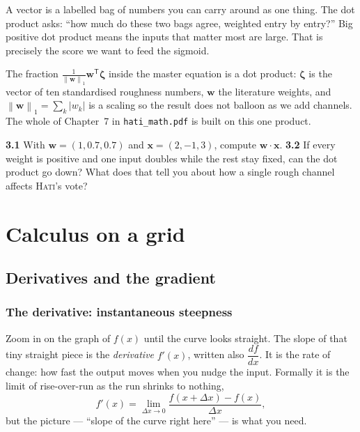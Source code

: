 \documentclass[11pt,oneside]{book}
\newcommand{\norm}[1]{\left\lVert #1\right\rVert}
\newcommand{\abs}[1]{\left\lvert #1\right\rvert}
\begin{document}
\begin{intuition}
A vector is a labelled bag of numbers you can carry around as one thing. The dot
product asks: ``how much do these two bags agree, weighted entry by entry?'' Big
positive dot product means the inputs that matter most are large. That is precisely
the score we want to feed the sigmoid.
\end{intuition}

\begin{hatibox}
The fraction $\frac{1}{\norm{\mathbf w}_1}\mathbf w^{\mathsf T}\boldsymbol\zeta$ inside
the master equation is a dot product: $\boldsymbol\zeta$ is the vector of ten
standardised roughness numbers, $\mathbf w$ the literature weights, and
$\norm{\mathbf w}_1=\sum_k\abs{w_k}$ is a scaling so the result does not balloon as we
add channels. The whole of Chapter~7 in \texttt{hati\_math.pdf} is built on this one
product.
\end{hatibox}

\begin{practice}
\textbf{3.1} With $\mathbf w=(1,0.7,0.7)$ and $\mathbf x=(2,-1,3)$, compute
$\mathbf w\cdot\mathbf x$. \quad\textbf{3.2} If every weight is positive and one input
doubles while the rest stay fixed, can the dot product go down? What does that tell you
about how a single rough channel affects \textsc{Hati}'s vote?
\end{practice}

\part{Calculus on a grid}

\chapter{Derivatives and the gradient}

\section{The derivative: instantaneous steepness}
Zoom in on the graph of $f(x)$ until the curve looks straight. The slope of that tiny
straight piece is the \emph{derivative} $f'(x)$, written also $\dfrac{df}{dx}$. It is
the rate of change: how fast the output moves when you nudge the input. Formally it is
the limit of rise-over-run as the run shrinks to nothing,
\begin{equation}
f'(x)=\lim_{\Delta x\to0}\frac{f(x+\Delta x)-f(x)}{\Delta x},
\end{equation}
but the picture --- ``slope of the curve right here'' --- is what you need.
\end{document}
